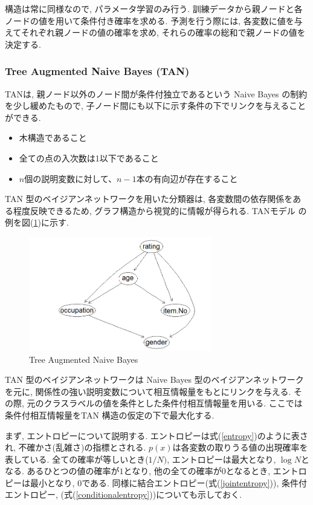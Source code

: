 \documentclass[a4paper]{jarticle}
\begin{document}
構造は常に同様なので, パラメータ学習のみ行う. 訓練データから親ノードと各ノードの値を用いて条件付き確率を求める. 予測を行う際には, 各変数に値を与えてそれぞれ親ノードの値の確率を求め, それらの確率の総和で親ノードの値を決定する.

\subsubsection{Tree Augmented Naive Bayes (TAN)}

TANは, 親ノード以外のノード間が条件付独立であるという Naive Bayes の制約を少し緩めたもので, 子ノード間にも以下に示す条件の下でリンクを与えることができる.~\cite{Friedman}

\begin{itemize}
\item 木構造であること

\item 全ての点の入次数は1以下であること

\item $n$個の説明変数に対して、$n-1$本の有向辺が存在すること
\end{itemize}

TAN 型のベイジアンネットワークを用いた分類器は, 各変数間の依存関係をある程度反映できるため, グラフ構造から視覚的に情報が得られる. TANモデル の例を図(\ref{TAN})に示す.

\begin{figure}[H]
 \begin{center}
  \includegraphics[width=80mm]{data/sample2.png}
 \end{center}
 \caption{Tree Augmented Naive Bayes}
 \label{TAN}
\end{figure}


TAN 型のベイジアンネットワークは Naive Bayes 型のベイジアンネットワークを元に, 関係性の強い説明変数について相互情報量をもとにリンクを与える. その際, 元のクラスラベルの値を条件とした条件付相互情報量を用いる. ここでは条件付相互情報量をTAN 構造の仮定の下で最大化する.

まず, エントロピーについて説明する. エントロピーは式(\ref{entropy})のように表され, 不確かさ(乱雑さ)の指標とされる. $p(x)$は各変数の取りうる値の出現確率を表している. 全ての確率が等しいとき($1/N)$, エントロピーは最大となり, $\log N$となる. あるひとつの値の確率が$1$となり, 他の全ての確率が$0$となるとき, エントロピーは最小となり, $0$である. 同様に結合エントロピー(式(\ref{jointentropy})), 条件付エントロピー, (式(\ref{conditionalentropy}))についても示しておく.
\end{document}
